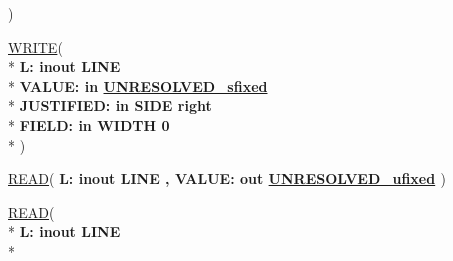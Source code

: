 \begin{DoxyCompactItemize}
   )
\item 
{\bfseries {\bfseries \textcolor{vhdlchar}{ }}} \hyperlink{classfixed__pkg_ad9b1585b0aca6b1c01027911cfa49bee}{W\+R\+I\+T\+E}( \\*
{\bfseries \textcolor{vhdlchar}{ }\textcolor{vhdlchar}{L\+: }\textcolor{stringliteral}{} {\bfseries \textcolor{keywordflow}{inout}\textcolor{vhdlchar}{ }\textcolor{vhdlchar}{L\+I\+N\+E}\textcolor{vhdlchar}{ }}}\\*
  {\bfseries \textcolor{vhdlchar}{ }\textcolor{vhdlchar}{V\+A\+L\+U\+E\+: }\textcolor{stringliteral}{} {\bfseries \textcolor{keywordflow}{in}\textcolor{vhdlchar}{ }{\bfseries \hyperlink{classfixed__pkg_aa723b28a027c3c0f9bca02d75e8df4d6}{U\+N\+R\+E\+S\+O\+L\+V\+E\+D\+\_\+sfixed}} \textcolor{vhdlchar}{ }}}\\*
  {\bfseries \textcolor{vhdlchar}{ }\textcolor{vhdlchar}{J\+U\+S\+T\+I\+F\+I\+E\+D\+: }\textcolor{stringliteral}{} {\bfseries \textcolor{keywordflow}{in}\textcolor{vhdlchar}{ }\textcolor{vhdlchar}{S\+I\+D\+E}\textcolor{vhdlchar}{ }\textcolor{vhdlchar}{ }\textcolor{vhdlchar}{ }\textcolor{vhdlchar}{ }\textcolor{vhdlchar}{ }\textcolor{vhdlkeyword}{right}\textcolor{vhdlchar}{ }}}\\*
  {\bfseries \textcolor{vhdlchar}{ }\textcolor{vhdlchar}{F\+I\+E\+L\+D\+: }\textcolor{stringliteral}{} {\bfseries \textcolor{keywordflow}{in}\textcolor{vhdlchar}{ }\textcolor{vhdlchar}{W\+I\+D\+T\+H}\textcolor{vhdlchar}{ }\textcolor{vhdlchar}{ }\textcolor{vhdlchar}{ } \textcolor{vhdldigit}{0} \textcolor{vhdlchar}{ }}}\\*
   )
\item 
{\bfseries {\bfseries \textcolor{vhdlchar}{ }}} \hyperlink{classfixed__pkg_a1b1262258b9fb1a68fec2aad83940efe}{R\+E\+A\+D}( {\bfseries \textcolor{vhdlchar}{ }\textcolor{vhdlchar}{L\+: }\textcolor{stringliteral}{} {\bfseries \textcolor{keywordflow}{inout}\textcolor{vhdlchar}{ }\textcolor{vhdlchar}{L\+I\+N\+E}\textcolor{vhdlchar}{ }}}{\bfseries ,\textcolor{vhdlchar}{ }\textcolor{vhdlchar}{V\+A\+L\+U\+E\+: }\textcolor{stringliteral}{} {\bfseries \textcolor{keywordflow}{out}\textcolor{vhdlchar}{ }{\bfseries \hyperlink{classfixed__pkg_ae78bc2b36d22f6abeac163955e8a587d}{U\+N\+R\+E\+S\+O\+L\+V\+E\+D\+\_\+ufixed}} \textcolor{vhdlchar}{ }}} )
\item 
{\bfseries {\bfseries \textcolor{vhdlchar}{ }}} \hyperlink{classfixed__pkg_ae7e16de39ab0d01050084742fd86814f}{R\+E\+A\+D}( \\*
{\bfseries \textcolor{vhdlchar}{ }\textcolor{vhdlchar}{L\+: }\textcolor{stringliteral}{} {\bfseries \textcolor{keywordflow}{inout}\textcolor{vhdlchar}{ }\textcolor{vhdlchar}{L\+I\+N\+E}\textcolor{vhdlchar}{ }}}\\*

\end{DoxyCompactItemize}
